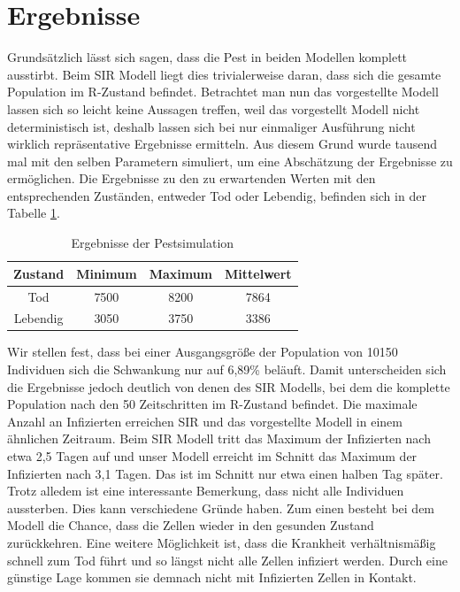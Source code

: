 \documentclass[10pt,twocolumn]{scrartcl}
\begin{document}
\section*{Ergebnisse}
Grundsätzlich lässt sich sagen, dass die Pest in beiden Modellen komplett ausstirbt. Beim SIR Modell liegt dies trivialerweise daran, dass sich die gesamte Population im R-Zustand befindet. Betrachtet man nun das vorgestellte Modell lassen sich so leicht keine Aussagen treffen, weil das vorgestellt Modell nicht deterministisch ist, deshalb lassen sich bei nur einmaliger Ausführung nicht wirklich repräsentative Ergebnisse ermitteln. Aus diesem Grund wurde tausend mal mit den selben Parametern simuliert, um eine Abschätzung der Ergebnisse zu ermöglichen. Die Ergebnisse zu den zu erwartenden Werten mit den entsprechenden Zuständen, entweder Tod oder Lebendig, befinden sich in der Tabelle \ref{tab:ergebnisse}.
\begin{table}[H]
	\caption{Ergebnisse der Pestsimulation}
	\label{tab:ergebnisse}
	\centering
	\begin{tabular}{|c|ccc|}
		\rowcolor{dunkelgrau}
		\hline
		Zustand &	Minimum & Maximum & Mittelwert \\ \hline
		Tod & 7500 & 8200 & 7864 \\ 
	\rowcolor{grau}		Lebendig & 3050 & 3750 & 3386\\
	\hline
	\end{tabular}
\end{table}
Wir stellen fest, dass bei einer Ausgangsgröße der Population von 10150 Individuen sich die Schwankung nur auf 6,89\% beläuft. Damit unterscheiden sich die Ergebnisse jedoch deutlich von denen des SIR Modells, bei dem die komplette Population nach den 50 Zeitschritten im R-Zustand befindet. Die maximale Anzahl an Infizierten erreichen SIR und das vorgestellte Modell in einem ähnlichen Zeitraum. Beim SIR Modell tritt das Maximum der Infizierten nach etwa 2,5 Tagen auf und unser Modell erreicht im Schnitt das Maximum der Infizierten nach 3,1 Tagen. Das ist im Schnitt nur etwa einen halben Tag später.
Trotz alledem ist eine interessante Bemerkung, dass nicht alle Individuen aussterben. Dies kann verschiedene Gründe haben. Zum einen besteht bei dem Modell die Chance, dass die Zellen wieder in den gesunden Zustand zurückkehren. Eine weitere Möglichkeit ist, dass die Krankheit verhältnismäßig schnell zum Tod führt und so längst nicht alle Zellen infiziert werden. Durch eine günstige Lage kommen sie demnach nicht mit Infizierten Zellen in Kontakt.   
\end{document}
